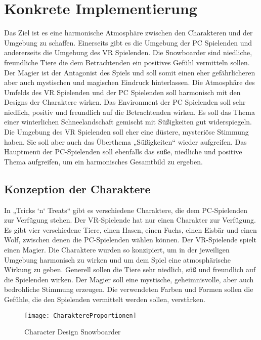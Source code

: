 \chapter{Konkrete Implementierung}
Das Ziel ist es eine harmonische Atmosphäre zwischen den Charakteren und der Umgebung zu schaffen. Einerseits gibt es die Umgebung der PC Spielenden und andererseits die Umgebung des VR Spielenden. Die Snowboarder sind niedliche, freundliche Tiere die dem Betrachtenden ein positives Gefühl vermitteln sollen. Der Magier ist der Antagonist des Spiels und soll somit einen eher gefährlicheren aber auch mystischen und magischen Eindruck hinterlassen. Die Atmosphäre des Umfelds des VR Spielenden und der PC Spielenden soll harmonisch mit den Designs der Charaktere wirken. Das Environment der PC Spielenden soll sehr niedlich, positiv und freundlich auf die Betrachtenden wirken. Es soll das Thema einer winterlichen Schneelandschaft gemischt mit Süßigkeiten gut widerspiegeln. Die Umgebung des VR Spielenden soll eher eine düstere, mysteriöse Stimmung haben. Sie soll aber auch das Überthema „Süßigkeiten“ wieder aufgreifen. Das Hauptmenü der PC-Spielenden soll ebenfalls das süße, niedliche und positive Thema aufgreifen, um ein harmonisches Gesamtbild zu ergeben.

\section{Konzeption der Charaktere}
In „Tricks ‘n‘ Treats“ gibt es verschiedene Charaktere, die dem PC-Spielenden zur Verfügung stehen. Der VR-Spielende hat nur einen Charakter zur Verfügung. Es gibt vier verschiedene Tiere, einen Hasen, einen Fuchs, einen Eisbär und einen Wolf, zwischen denen die PC-Spielenden wählen können. Der VR-Spielende spielt einen Magier. Die Charaktere wurden so konzipiert, um in der jeweiligen Umgebung harmonisch zu wirken und um dem Spiel eine atmosphärische Wirkung zu geben. Generell sollen die Tiere sehr niedlich, süß und freundlich auf die Spielenden wirken. Der Magier soll eine mystische, geheimnisvolle, aber auch bedrohliche Stimmung erzeugen. Die verwendeten Farben und Formen sollen die Gefühle, die den Spielenden vermittelt werden sollen, verstärken.
 
 \begin{figure}[H]
 	\centering
 	\texttt{[image: CharaktereProportionen]}
 	\caption{Character Design Snowboarder}
 \end{figure}

